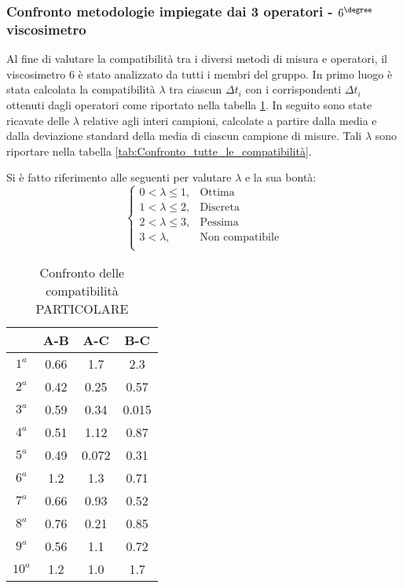 \documentclass[a4paper,11pt,oneside]{article}
\begin{document}

\subsubsection*{Confronto metodologie impiegate dai 3 operatori - $6^{\degree}$ viscosimetro}%
Al fine di valutare la compatibilità tra i diversi metodi di misura e operatori, il viscosimetro 6 è stato analizzato da tutti i membri del gruppo.
In primo luogo è stata calcolata la compatibilità $\lambda$ tra ciascun $\Delta t_i$ con i corrispondenti $\Delta t_i$ ottenuti dagli operatori come riportato nella tabella \ref{tab:Confronto_tutte_le_compatibilità_per_ogni_misura}.
In seguito sono state ricavate delle $\lambda$ relative agli interi campioni, calcolate a partire dalla media e dalla deviazione standard della media di ciascun campione di misure. Tali $\lambda$ sono riportare nella tabella \ref{tab:Confronto_tutte_le_compatibilità}.

Si è fatto riferimento alle seguenti per valutare $\lambda$ e la sua bontà:
\begin{equation*}%
    \label{eq:cases}
    \begin{cases}
    0<\lambda\leq 1, & \text{Ottima}\\
    1<\lambda\leq2, & \text{Discreta}\\
    2<\lambda\leq3, & \text{Pessima}\\
    3<\lambda, & \text{Non compatibile}\\
    \end{cases}
\end{equation*}


\begin{table}[h]
\centering
\caption{Confronto delle compatibilità PARTICOLARE}
\label{tab:Confronto_tutte_le_compatibilità_per_ogni_misura}
\begin{tabular}{|c|c|c|c|} 
\hline
\textbf{} & \textbf{A-B} & \textbf{A-C} & \textbf{B-C} \\
\hline
\rowcolor[rgb]{0.85,0.85,0.85}  $1^a$  & 0.66 & 1.7 & 2.3  \\ 
\hline
 $2^a$ & 0.42 & 0.25 & 0.57  \\ 
\hline
\rowcolor[rgb]{0.85,0.85,0.85}  $3^a$  & 0.59 & 0.34 & 0.015  \\ 
\hline
 $4^a$ & 0.51 & 1.12 & 0.87  \\ 
\hline
\rowcolor[rgb]{0.85,0.85,0.85}  $5^a$  & 0.49 & 0.072 & 0.31  \\ 
\hline
 $6^a$ & 1.2 & 1.3 & 0.71  \\ 
\hline
\rowcolor[rgb]{0.85,0.85,0.85}  $7^a$  & 0.66 & 0.93 & 0.52  \\ 
\hline
 $8^a$ & 0.76 & 0.21 & 0.85  \\ 
\hline
\rowcolor[rgb]{0.85,0.85,0.85}  $9^a$ & 0.56 & 1.1 & 0.72  \\ 
\hline
 $10^a$ & 1.2 & 1.0 & 1.7  \\
\hline
\end{tabular}
\end{table}
\end{document}
